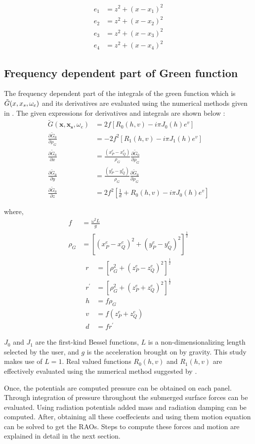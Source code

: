 \begin{align}
    e_1 &= z^2+(x-x_1)^2\\
    e_2 &= z^2+(x-x_2)^2\\
    e_3 &= z^2+(x-x_3)^2\\
    e_4 &= z^2+(x-x_4)^2
\end{align}

\subsection{Frequency dependent part of Green function}
The frequency dependent part of the integrals of the green function which is $\Tilde{G}(x, x_s, \omega_e)$ and its derivatives are 
evaluated using the numerical methods given in \cite{telste1986numerical}. The given expressions for derivatives and integrals are shown below : 
\begin{align}
    \tilde{G}(\boldsymbol{x},\boldsymbol{x_s}, \omega_e) &= 2f\left[ R_0(h,v) - i \pi J_0(h)e^{v}\right]\\
    \frac{\partial{\tilde{G}_0}}{\partial{\rho_G}} &= -2f^{2}\left[R_1(h,v)-i\pi J_{1}(h)e^v\right]\\
    \frac{\partial{\tilde{G}_0}}{\partial{x}} &=\frac{(x^e_P-x^e_Q)}{\rho_G}\frac{\partial{\tilde{G}_0}}{\partial{\rho_G}}\\
    \frac{\partial \tilde{G}_{0}}{\partial y} &= \frac{\left(y^e_P-y^e_Q\right)}{\rho_G} \frac{\partial \tilde{G}_{0}}{\partial \rho_G}\\
    \frac{\partial \tilde{G}_{0}}{\partial z} &= 2 f^{2}\left[\frac{1}{d}+R_{0}(h, v)-i \pi J_{0}(h) e^{v}\right]
\end{align}

where, 
\begin{align}
    f &= \frac{\omega^2 L}{g} \\
    \rho_G &= \left[(x^e_P-x^e_Q)^2 + (y^e_P-y^e_Q)^2\right]^{\frac{1}{2}}
\end{align}
\begin{align}
    r &= \left[\rho^2_G+(z^e_P-z^e_Q)^2\right]^{\frac{1}{2}} \\
    {r}^{\prime}&= \left[\rho^2_G+(z^e_P+z^e_Q)^2\right]^{\frac{1}{2}} \\
    h &= f\rho_G \\
    v &= f(z^e_P+z^e_Q) \\
    d &= f {r}^{\prime}
\end{align}

$J_0$ and $J_1$ are the first-kind Bessel functions, $L$ is a non-dimensionalizing length selected by the user, 
and $g$ is the acceleration brought on by gravity. This study makes use of $L=1$. Real valued functions $R_0(h,v)$ 
and $R_1(h,v)$ are effectively evaluated using the numerical method suggested by \cite{telste1986numerical}.

Once, the potentials are computed pressure can be obtained on each panel.
Through integration of pressure throughout the submerged surface forces can be evaluated. 
Using radiation potentials added mass and radiation damping can be computed. 
After, obtaining all these coeffecients and using them motion equation can be solved to get the RAOs.
Steps to compute these forces and motion are explained in detail in the next section.
